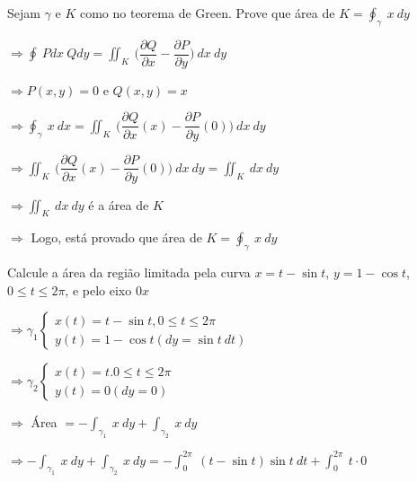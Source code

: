 \documentclass[11pt,a4paper]{article}
\begin{document}
\begin{enumerate}
{{		%
		\item Sejam $\gamma$ e $K$ como no teorema de Green. Prove que área de $K = \oint_\gamma\ x\ dy$
		
		$\Rightarrow \displaystyle\oint\ Pdx\ Qdy = \displaystyle\iint_K\ \Bigg(\dfrac{\partial Q}{\partial x} - \dfrac{\partial P}{\partial y}\Bigg)\ dx\ dy$
		
		$\Rightarrow P(x,y) = 0$ e $Q(x,y) = x$
		
		$\Rightarrow \displaystyle\oint_\gamma\ x\ dx = \displaystyle\iint_K\ \Bigg(\dfrac{\partial Q}{\partial x}(x) - \dfrac{\partial P}{\partial y}(0)\Bigg)\ dx\ dy $
		
		$\Rightarrow \displaystyle\iint_K\ \Bigg(\dfrac{\partial Q}{\partial x}(x) - \dfrac{\partial P}{\partial y}(0)\Bigg)\ dx\ dy = \displaystyle\iint_K\ dx\ dy$
		
		$\Rightarrow \displaystyle\iint_K\ dx\ dy$ é a área de $K$
		
		$\Rightarrow$ Logo, está provado que área de $K = \oint_\gamma\ x\ dy$
		
		\item Calcule a área da região limitada pela curva $x = t - \sin t$, $y = 1 - \cos t$, $0 \leq t \leq 2\pi$, e pelo eixo $0x$
		
		$\Rightarrow \gamma_1\begin{cases}
		x(t) = t - \sin t, 0 \leq t \leq 2\pi \\
		y(t) = 1 - \cos t (dy = \sin t\ dt)
		\end{cases}$
		
		$\Rightarrow \gamma_2\begin{cases}
		x(t) = t. 0 \leq t \leq 2\pi \\
		y(t) = 0 (dy = 0)
		\end{cases}$
		
		$\Rightarrow$ Área $= -\displaystyle\int_{\gamma_1}\ x\ dy  + \displaystyle\int_{\gamma_2}\ x\ dy$
		
		$\Rightarrow -\displaystyle\int_{\gamma_1}\ x\ dy  + \displaystyle\int_{\gamma_2}\ x\ dy = - \displaystyle\int_{0}^{2\pi}\ (t - \sin t)\sin t\ dt + \displaystyle\int_{0}^{2\pi}\ t \cdot 0$
		
}}
\end{enumerate}
\end{document}

